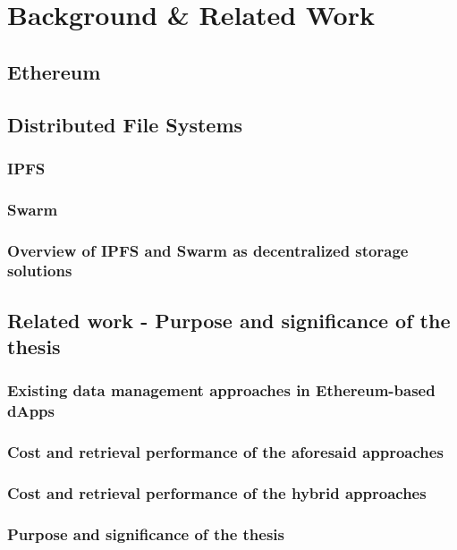 \chapter{Background \& Related Work}\label{chapter:background}

\section{Ethereum}\label{sec:}
\section{Distributed File Systems}\label{sec:}
\subsection{IPFS}\label{subsection:}
\subsection{Swarm}\label{subsection:}
\subsection{Overview of IPFS and Swarm as decentralized storage solutions}\label{sec:}

\section{Related work - Purpose and significance of the thesis}\label{sec:}
\subsection{Existing data management approaches in Ethereum-based dApps}\label{subsection:}
\subsection{Cost and retrieval performance of the aforesaid approaches}\label{subsection:}
\subsection{Cost and retrieval performance of the hybrid approaches}\label{subsection:}
\subsection{Purpose and significance of the thesis}\label{subsection:}

